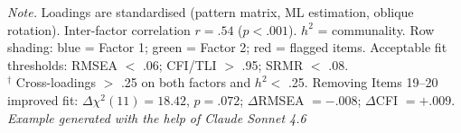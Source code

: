 \documentclass[12pt, a4paper]{article}
\begin{document}
\begin{table}[ht]
\noindent\footnotesize
\textit{Note.} Loadings are standardised (pattern matrix, ML estimation, oblique rotation).
Inter-factor correlation $r = .54$ ($p < .001$). $h^2$ = communality.
Row shading: \colorbox{factor1col}{blue} = Factor 1; \colorbox{factor2col}{green} = Factor 2;
\colorbox{poorload}{red} = flagged items.
Acceptable fit thresholds: RMSEA $<$ .06; CFI/TLI $>$ .95; SRMR $<$ .08. \\[4pt]
$^{\dagger}$ Cross-loadings $>$ .25 on both factors and $h^2 <$ .25.
Removing Items 19--20 improved fit:
$\Delta\chi^2(11) = 18.42$, $p = .072$; $\Delta$RMSEA $= -.008$; $\Delta$CFI $= +.009$.\\
\vspace{6pt}
\emph{Example generated with the help of Claude Sonnet 4.6}
\end{table}
\end{document}
